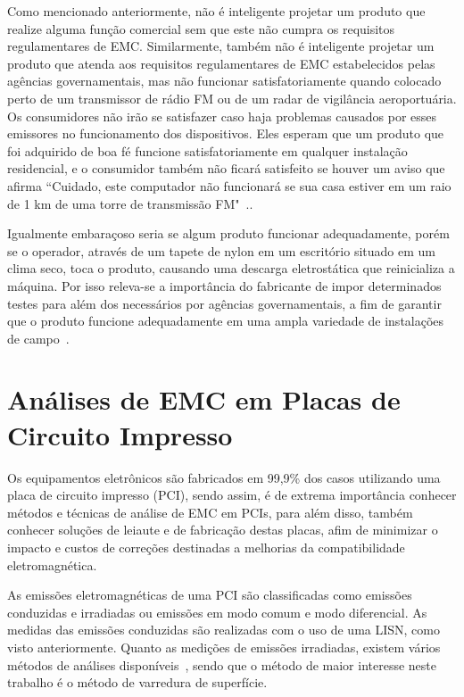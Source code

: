Como mencionado anteriormente, não é inteligente projetar um produto que realize alguma
função comercial sem que este não cumpra os requisitos regulamentares de EMC. Similarmente, também não é inteligente projetar um produto que atenda aos requisitos regulamentares de EMC estabelecidos pelas agências governamentais, mas não funcionar satisfatoriamente quando colocado perto de um transmissor de rádio FM ou de um radar de vigilância aeroportuária. Os consumidores não irão se satisfazer caso haja problemas causados por esses emissores no funcionamento dos dispositivos. Eles esperam que um produto que foi adquirido de boa fé funcione satisfatoriamente em qualquer instalação residencial, e o consumidor também não ficará satisfeito se houver um aviso que afirma “Cuidado, este computador não funcionará se sua casa estiver em um raio de 1 km de uma torre de transmissão FM"~\cite[p.~79]{paul2006}.. 

Igualmente embaraçoso seria se algum produto funcionar adequadamente, porém se o operador, através de um tapete de nylon em um escritório situado em um clima seco, toca o produto, causando uma descarga eletrostática que reinicializa a máquina. Por isso releva-se a importância do fabricante de impor determinados testes para além dos necessários por agências governamentais, a fim de garantir que o produto funcione adequadamente em uma ampla variedade de instalações de campo~\cite[p.~79]{paul2006}. 

\section{Análises de EMC em Placas de Circuito Impresso}
Os equipamentos eletrônicos são fabricados em 99,9\% dos casos utilizando uma placa de circuito impresso (PCI), sendo assim, é de extrema importância conhecer métodos e técnicas de análise de EMC em PCIs, para além disso, também conhecer soluções de leiaute e de fabricação destas placas, afim de minimizar o impacto e custos de correções destinadas a melhorias da compatibilidade eletromagnética.

As emissões eletromagnéticas de uma PCI são classificadas como emissões conduzidas e irradiadas ou emissões em modo comum e modo diferencial. As medidas das emissões conduzidas são realizadas com o uso de uma LISN, como visto anteriormente. Quanto as medições de emissões irradiadas, existem vários métodos de análises disponíveis~, sendo que o método de maior interesse neste trabalho é o método de varredura de superfície.

